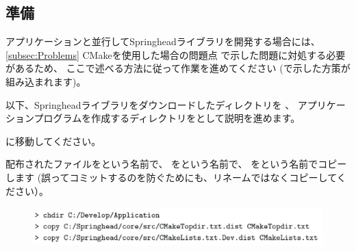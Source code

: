 \subsection{準備}
\label{subsec:PrepareApplication}

\noindent
アプリケーションと並行してSpringheadライブラリを開発する場合には、
\KQuoteS\ref{subsec:Problems} CMakeを使用した場合の問題点\KQuoteE
で示した問題に対処する必要があるため、
ここで述べる方法に従って作業を進めてください
(で示した方策が組み込まれます)。

\medskip
以下、Springheadライブラリをダウンロードしたディレクトリを\SprTop{} 、
アプリケーションプログラムを作成するディレクトリを\AppTop{}として説明を進めます。

\bigskip
\noindent
\AppTop{}に移動してください。

\bigskip
\noindent
配布されたファイルを\CMakeTopdir{}という名前で、
を\CMakeLists{}という名前で、
を\CMakeSettings{}という名前でコピーします
(誤ってコミットするのを防ぐためにも、リネームではなくコピーしてください）。

\medskip
\ifLwarp
	\begin{figure}[h]
	    \begin{center}
	    \includegraphics[width=\textwidth]{fig/command-3-1-a.eps}
	    \end{center}
	    \label{fig:DownloadTree}
	\end{figure}
\else
\begin{narrow}[15pt]
\end{narrow}
\fi

